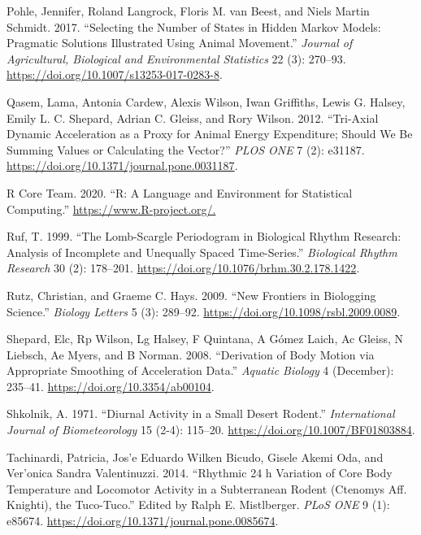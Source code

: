 \documentclass[msc,numbers,hidelinks]{coppe}
\newlength{\cslhangindent}
\newenvironment{CSLReferences}[2] %
 {%
  \setlength{\parindent}{0pt}
  \ifodd #1 \everypar{\setlength{\hangindent}{\cslhangindent}}\ignorespaces\fi
  \ifnum #2 > 0
  \setlength{\parskip}{#2\baselineskip}
  \fi
 }%
 {}
\begin{document}
\begin{CSLReferences}{1}{0}
  \leavevmode{}%
  Pohle, Jennifer, Roland Langrock, Floris M. van Beest, and Niels Martin Schmidt. 2017. {``Selecting the Number of States in Hidden Markov Models: Pragmatic Solutions Illustrated Using Animal Movement.''} \emph{Journal of Agricultural, Biological and Environmental Statistics} 22 (3): 270--93. \url{https://doi.org/10.1007/s13253-017-0283-8}.

  \leavevmode{}%
  Qasem, Lama, Antonia Cardew, Alexis Wilson, Iwan Griffiths, Lewis G. Halsey, Emily L. C. Shepard, Adrian C. Gleiss, and Rory Wilson. 2012. {``Tri-Axial Dynamic Acceleration as a Proxy for Animal Energy Expenditure; Should We Be Summing Values or Calculating the Vector?''} \emph{PLOS ONE} 7 (2): e31187. \url{https://doi.org/10.1371/journal.pone.0031187}.

  \leavevmode{}%
  R Core Team. 2020. {``R: A Language and Environment for Statistical Computing.''} \url{https://www.R-project.org/.}

  \leavevmode{}%
  Ruf, T. 1999. {``The Lomb-Scargle Periodogram in Biological Rhythm Research: Analysis of Incomplete and Unequally Spaced Time-Series.''} \emph{Biological Rhythm Research} 30 (2): 178--201. \url{https://doi.org/10.1076/brhm.30.2.178.1422}.

  \leavevmode{}%
  Rutz, Christian, and Graeme C. Hays. 2009. {``New Frontiers in Biologging Science.''} \emph{Biology Letters} 5 (3): 289--92. \url{https://doi.org/10.1098/rsbl.2009.0089}.

  \leavevmode{}%
  Shepard, Elc, Rp Wilson, Lg Halsey, F Quintana, A Gómez Laich, Ac Gleiss, N Liebsch, Ae Myers, and B Norman. 2008. {``Derivation of Body Motion via Appropriate Smoothing of Acceleration Data.''} \emph{Aquatic Biology} 4 (December): 235--41. \url{https://doi.org/10.3354/ab00104}.

  \leavevmode{}%
  Shkolnik, A. 1971. {``Diurnal Activity in a Small Desert Rodent.''} \emph{International Journal of Biometeorology} 15 (2-4): 115--20. \url{https://doi.org/10.1007/BF01803884}.

  \leavevmode{}%
  Tachinardi, Patricia, Jos'e Eduardo Wilken Bicudo, Gisele Akemi Oda, and Ver'onica Sandra Valentinuzzi. 2014. {``Rhythmic 24 h {Variation} of {Core Body Temperature} and {Locomotor Activity} in a {Subterranean Rodent} ({Ctenomys} Aff. Knighti), the {Tuco-Tuco}.''} Edited by Ralph E. Mistlberger. \emph{PLoS ONE} 9 (1): e85674. \url{https://doi.org/10.1371/journal.pone.0085674}.


\end{CSLReferences}
\end{document}
